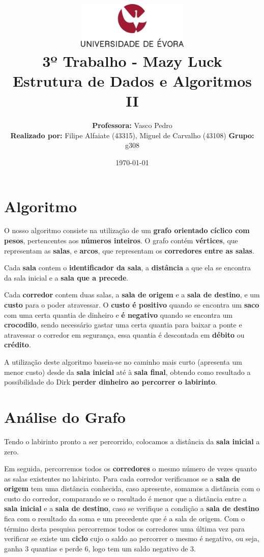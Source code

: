 \documentclass[11pt]{article}
\title
{
    \includegraphics[width=0.4\textwidth]{imgs/university.png}
    \\[0.1cm]
    \textbf{3º Trabalho - Mazy Luck} \\
    Estrutura de Dados e Algoritmos II
}
\author
{
    \textbf{Professora:} Vasco Pedro \\
    \textbf{Realizado por:} Filipe Alfaiate (43315), Miguel de Carvalho (43108)
    \textbf{Grupo:} g308
}
\date{\today}
\begin{document}
\maketitle

\section{Algoritmo}

\hspace{0,6cm}O nosso algoritmo consiste na utilização de um \textbf{grafo orientado cíclico
com pesos}, pertencentes aos \textbf{números inteiros}. O grafo contém \textbf{vértices}, que
representam as \textbf{salas}, e \textbf{arcos}, que representam os \textbf{corredores entre
as salas}.

Cada \textbf{sala} contem o \textbf{identificador da sala}, a \textbf{distância} a que ela se 
encontra da sala inicial e a \textbf{sala que a precede}. 

Cada \textbf{corredor} contem duas salas, a \textbf{sala de origem} e a \textbf{sala de destino},
e um \textbf{custo} para o poder atravessar. O \textbf{custo é positivo} quando se encontra um
\textbf{saco} com uma certa quantia de dinheiro e \textbf{é negativo} quando se encontra um
\textbf{crocodilo}, sendo necessário gastar uma certa quantia para baixar a ponte e atravessar o
corredor em segurança, essa quantia é descontada em \textbf{débito} ou \textbf{crédito}.

A utilização deste algoritmo baseia-se no caminho mais curto (apresenta um menor custo) desde da
\textbf{sala inicial} até à \textbf{sala final}, obtendo como resultado a possibilidade do
Dirk \textbf{perder dinheiro ao percorrer o labirinto}.

\section{Análise do Grafo}

\hspace{0,45cm} Tendo o labirinto pronto a ser percorrido, colocamos a distância da \textbf{sala 
inicial} a zero. 

Em seguida, percorremos todos os \textbf{corredores} o mesmo número de vezes quanto as salas existentes no
labirinto. Para cada corredor verificamos se a \textbf{sala de origem} tem uma distância conhecida,
caso apresente, somamos a distância com o custo do corredor, comparando se o resultado é menor que a
distância entre a \textbf{sala inicial} e a \textbf{sala de destino}, caso se verifique a condição
a \textbf{sala de destino} fica com o resultado da soma e um precedente que é a sala de origem.
Com o término desta pesquisa percorremos todos os corredores uma última vez para verificar se 
existe um \textbf{ciclo} cujo o saldo ao percorrer o mesmo é negativo, ou seja, ganha 3 quantias
e perde 6, logo tem um saldo negativo de 3.
\end{document}
